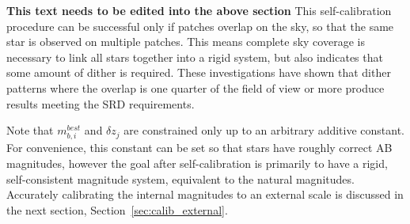 \documentclass[12pt,preprint]{aastex}
\begin{document}
{\bf This text needs to be edited into the above section }
This self-calibration procedure can be successful only if patches
overlap on the sky, so that the same star is observed on 
multiple patches. This means complete sky coverage is necessary to
link all stars together into a rigid system, but also indicates that
some amount of dither is required. These investigations have shown
that dither patterns where the overlap is one quarter of the field of
view or more produce results meeting the SRD requirements. 

Note that $m_{b,i}^{best}$ and $\delta z_j$ are
constrained only up to an arbitrary additive constant. For
convenience, this constant can be set so that stars have roughly
correct AB magnitudes, however the goal after self-calibration is
primarily to have a rigid, self-consistent magnitude system,
equivalent to the natural magnitudes. Accurately calibrating the internal
magnitudes to an external scale is discussed in the next section, 
Section~\ref{sec:calib_external}. 
\end{document}
